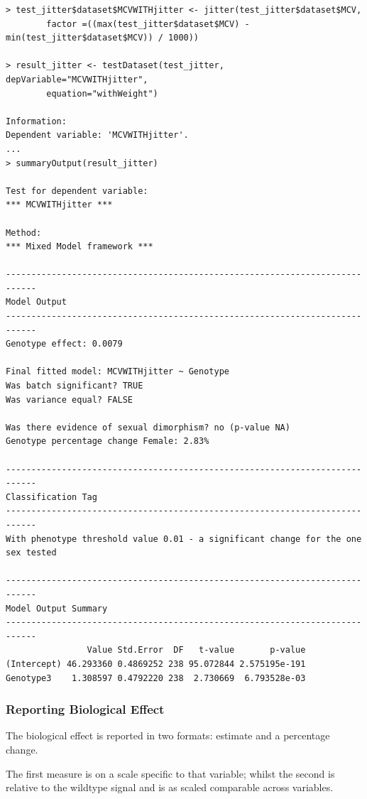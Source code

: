 \documentclass[12pt,a4paper]{article}
\begin{document}
\begingroup
    \fontsize{8pt}{12pt}\selectfont
\begin{verbatim}
> test_jitter$dataset$MCVWITHjitter <- jitter(test_jitter$dataset$MCV, 
        factor =((max(test_jitter$dataset$MCV) - min(test_jitter$dataset$MCV)) / 1000))

> result_jitter <- testDataset(test_jitter, depVariable="MCVWITHjitter",
        equation="withWeight")

Information:
Dependent variable: 'MCVWITHjitter'.
...
> summaryOutput(result_jitter)

Test for dependent variable:
*** MCVWITHjitter ***

Method:
*** Mixed Model framework ***

----------------------------------------------------------------------------
Model Output
----------------------------------------------------------------------------
Genotype effect: 0.0079

Final fitted model: MCVWITHjitter ~ Genotype
Was batch significant? TRUE
Was variance equal? FALSE

Was there evidence of sexual dimorphism? no (p-value NA)
Genotype percentage change Female: 2.83%

----------------------------------------------------------------------------
Classification Tag
----------------------------------------------------------------------------
With phenotype threshold value 0.01 - a significant change for the one sex tested

----------------------------------------------------------------------------
Model Output Summary
----------------------------------------------------------------------------
                Value Std.Error  DF   t-value       p-value
(Intercept) 46.293360 0.4869252 238 95.072844 2.575195e-191
Genotype3    1.308597 0.4792220 238  2.730669  6.793528e-03

\end{verbatim}
\endgroup

\subsubsection{Reporting Biological Effect}
\label{section:BiologicalEffect}
The biological effect is reported in two formats: estimate and a percentage change. 

The first measure is on a scale specific to that variable; whilst the second is relative to the wildtype signal and is as scaled comparable across variables. 
\end{document}
